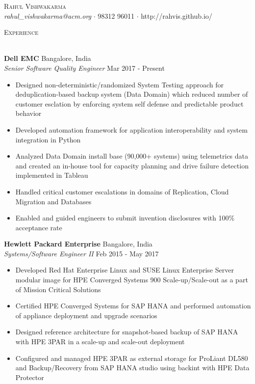 \documentclass[a4paper]{article}
\newcommand{\lineunder} {
    \vspace*{-8pt} \\
    \hspace*{-18pt} \hrulefill \\
}
\newcommand{\header} [1] {
    {\hspace*{-18pt}\vspace*{6pt} \textsc{#1}}
    \vspace*{-6pt} \lineunder
}
\begin{document}
\vspace*{-40pt}

    

\vspace*{-10pt}
\begin{center}
	{\Huge \scshape {Rahul Vishwakarma}}\\
	\vspace{2mm}
	{\emph{rahul\_vishwakarma@acm.org}} $\cdot$ 98312 96011 $\cdot$ http://rahvis.github.io/\\
\end{center}

{\color{blue}\header{Experience}}

\vspace{1mm}

\textbf{Dell EMC} \hfill Bangalore, India\\
\textit{Senior Software Quality Engineer} \hfill Mar 2017 - Present\\
\vspace{-1mm}
\justify
\begin{itemize} \itemsep 1pt

	\item Designed non-deterministic/randomized System Testing approach for deduplication-based backup system (Data Domain) which reduced number of customer esclation by enforcing system self defense and predictable product behavior
	\item Developed automation framework for application interoperability and system integration in Python
	\item Analyzed Data Domain install base (90,000+ systems) using telemetrics data and created an in-house tool for capacity planning and drive failure detection implemented in Tableau 
	\item Handled critical customer escalations in domains of Replication, Cloud Migration and Databases 
	\item Enabled and guided engineers to submit invention disclosures with 100\% acceptance rate
\end{itemize}
\vspace{2mm}
\textbf{Hewlett Packard Enterprise} \hfill Bangalore, India\\
\textit{Systems/Software Engineer II} \hfill Feb 2015 - May 2017\\
\vspace{-1mm}
\justify
\begin{itemize} \itemsep 1pt
	\item Developed Red Hat Enterprise Linux and SUSE Linux Enterprise Server modular image for HPE Converged Systems 900 Scale-up/Scale-out as a part of Mission Critical Solutions
	\item Certified HPE Converged Systems for SAP HANA and performed automation of appliance deployment and upgrade scenarios
	\item Designed reference architecture for snapshot-based backup of SAP HANA with HPE 3PAR in a scale-up and scale-out deployment
	\item Configured and managed HPE 3PAR as external storage for ProLiant DL580 and Backup/Recovery from SAP HANA studio using backint with HPE Data Protector
\end{itemize}
\end{document}

